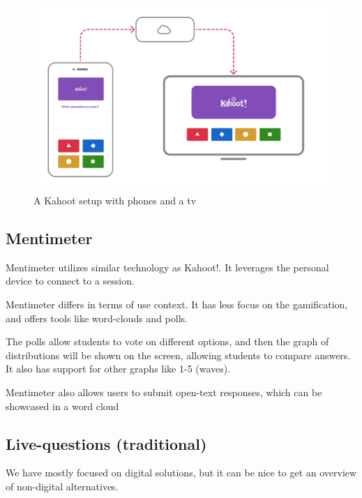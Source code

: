 
\begin{figure}[H]
    \centering
    \includegraphics[width=1\linewidth]{figures/kahoot-illustration.png}
    \caption{A Kahoot setup with phones and a tv}
    \label{fig:kahoot}
\end{figure}

\subsection{Mentimeter}
Mentimeter utilizes similar technology as Kahoot!. It leverages the personal device to connect to a session. 

Mentimeter differs in terms of use context. It has less focus on the gamification, and offers tools like word-clouds and polls.

The polls allow students to vote on different options, and then the graph of distributions will be shown on the screen, allowing students to compare answers. It also has support for other graphs like 1-5 (waves).

Mentimeter also allows users to submit open-text responses, which can be showcased in a word cloud

\subsection{Live-questions (traditional)}

We have mostly focused on digital solutions, but it can be nice to get an overview of non-digital alternatives.

